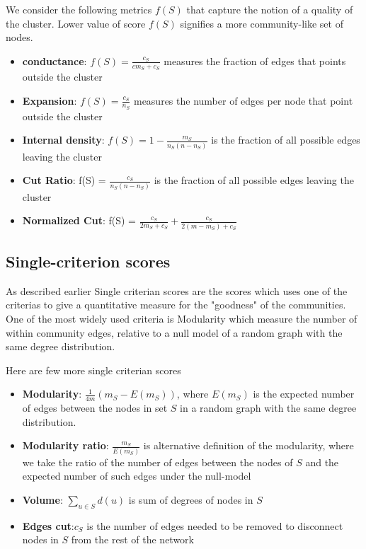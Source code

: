 \documentclass[letterpaper]{article}
\begin{document}
We consider the following metrics $f(S)$ that capture the notion of a quality of the cluster. Lower value of score $f(S)$ signifies a more community-like set of 
nodes.
\begin{itemize}
\item \textbf{conductance}: $f(S) = \frac{c_S}{c m_S+c_S}$ measures the fraction of edges that points outside the
cluster \cite{good04,shi2000}
\item \textbf{Expansion}: $f(S) = \frac{c_S}{n_S}$ measures the number of edges per node that point outside the
cluster \cite{radi04}
\item \textbf{Internal density}: $f(S) = 1 - \frac{m_S}{n_S(n-n_S)}$ is the fraction of all possible edges leaving
the cluster \cite{radi04}
\item \textbf{Cut Ratio}: f(S) = $\frac{c_S}{n_S(n-n_S)}$ is the fraction of all possible edges leaving the cluster 
\item \textbf{Normalized Cut}:  f(S) = $\frac{c_S}{2m_S+c_S} + \frac{c_S}{2(m-m_S)+c_S}$ \cite{shi2000}
\end{itemize}

\subsection{Single-criterion scores}
As described earlier Single criterian scores are the scores which uses one of
the criterias to give a quantitative measure for the "goodness" of the
communities. One of the most widely used criteria is Modularity
\cite{newmod2006} which measure the number of within community edges, relative
to a null model of a random graph with the same degree distribution.

Here are few more single criterian scores
\begin{itemize}
\item \textbf{Modularity}: $\frac{1}{4m}(m_S-E(m_S))$, where $E(m_S)$ is the expected number of edges between
the nodes in set $S$ in a random graph with the same degree distribution.
\item \textbf{Modularity ratio}: $\frac{m_S}{E(m_S)}$ is alternative definition of the modularity, where we take 
the ratio of the number of edges between the nodes of $S$ and the expected number of such edges under the
null-model
\item \textbf{Volume}: $\sum_{u\in S}d(u)$ is sum of degrees of nodes in $S$
\item \textbf{Edges cut}:$c_S$ is the number of edges needed to be removed to disconnect nodes in $S$ from the 
rest of the network
\end{itemize}
\end{document}
